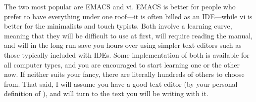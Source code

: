 \documentclass[12pt]{article}
\def\ind#1{\index{#1}#1}
\begin{document}
The two most popular are \ind{EMACS} and \ind{vi}. EMACS is better for
people who prefer to have everything under one roof---it is often billed
as an IDE---while vi is better for the minimalists and touch typists. Both
involve a learning curve, meaning that they will be difficult to use at
first, will require reading the manual, and will in the long run save
you hours over using simpler text editors such as those typically
included with IDEs. Some implementation of both is available for all
computer types, and you are encouraged to start learning one or the other
now. If neither suits your fancy, there are literally hundreds of others
to choose from. That said, I will assume you have a good text editor
(by your personal definition of ), and will turn to the text you
will be writing with it.
\ifbook \else 
	
\fi
\end{document}

